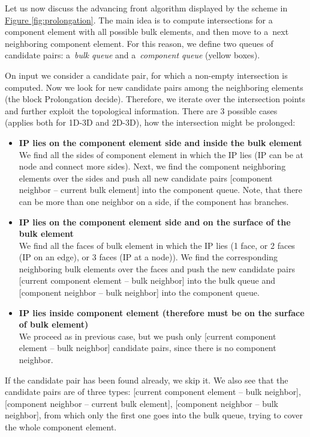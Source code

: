\documentclass{elsarticle}
\newcommand{\fig}[1]{\hyperref[#1]{Figure \ref{#1}}}
\begin{document}
Let us now discuss the advancing front algorithm displayed by the scheme in \fig{fig:prolongation}. The main idea is to compute intersections for a component element with all possible bulk elements, and then move to a~next neighboring component element. For this reason, we define two
queues of candidate pairs: a~\emph{bulk queue} and a~\emph{component queue} (yellow boxes).

On input we consider a candidate pair, for which a non-empty intersection is computed.
Now we look for new candidate pairs among the neighboring elements (the block Prolongation decide).
Therefore, we iterate over the intersection points and further exploit the topological information.
There are 3 possible cases (applies both for 1D-3D and 2D-3D), how the intersection might be prolonged:
\begin{itemize}
    \item \textbf{IP lies on the component element side and inside the bulk element} \\
            We find all the sides of component element in which the IP lies (IP can be at node and connect more sides).
            Next, we find the component neighboring elements over the sides and push all new candidate pairs
            [component neighbor -- current bulk element] into the component queue.
            Note, that there can be more than one neighbor on a side, if the component has branches.
    \item \textbf{IP lies on the component element side and on the surface of the bulk element} \\
            We find all the faces of bulk element in which the IP lies (1 face, or 2 faces (IP on an edge), 
            or 3 faces (IP at a node)). We find the corresponding neighboring bulk elements over the faces and
            push the new candidate pairs [current component element -- bulk neighbor] into the bulk queue and [component neighbor -- bulk neighbor] into the component queue.
    \item \textbf{IP lies inside component element (therefore must be on the surface of bulk element)} \\
            We proceed as in previous case, but we push only [current component element -- bulk neighbor] candidate pairs, since there is no component neighbor.
\end{itemize}

If the candidate pair has been found already, we skip it.
We also see that the candidate pairs are of three types:
[current component element -- bulk neighbor],
[component neighbor -- current bulk element], 
[component neighbor -- bulk neighbor],
from which only the first one goes into the bulk queue, trying to cover the whole component element.
\end{document}
